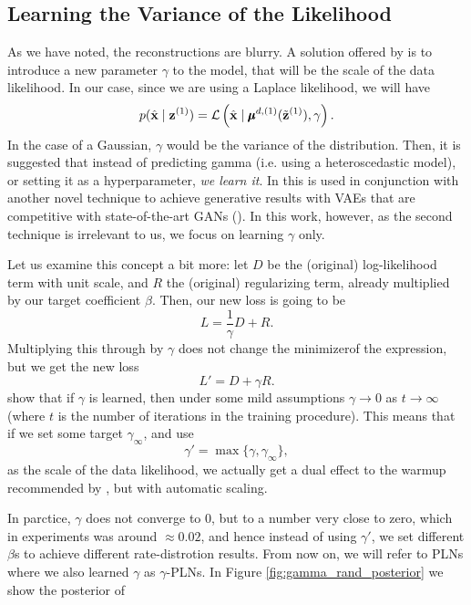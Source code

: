 \subsection{Learning the Variance of the Likelihood}
\label{sec:learn_gamma}
\par
As we have noted, the reconstructions are blurry.
A solution offered by \cite{dai2019diagnosing} is to introduce a new parameter
$\gamma$ to the model, that will be the scale of the data likelihood. In our
case, since we are using a Laplace likelihood, we will have
\[
  p(\hat{\mathbf{x}} \mid \mathbf{z}^{(1)}) = \mathcal{L}\left( \hat{\mathbf{x}} \mid \pmb{\mu}^{d,
      (1)}(\tilde{\mathbf{z}}^{(1)}), \gamma \right).
\]
In the case of a Gaussian, $\gamma$ would be the variance of the distribution.
Then, it is suggested that instead of predicting gamma (i.e. using a
heteroscedastic model), or setting it as a hyperparameter, \textit{we learn it}.
In \cite{dai2019diagnosing} this is used in conjunction with another novel
technique to achieve generative results with VAEs that are competitive with
state-of-the-art GANs (\cite{goodfellow2014generative}). In this work, however,
as the second technique is irrelevant to us, we focus on learning $\gamma$ only.
\par
Let us examine this concept a bit more: let $D$ be the (original) log-likelihood
term with unit scale, and $R$ the (original) regularizing term, already
multiplied by our target coefficient $\beta$. Then, our new loss is going to be
\[
  L = \frac{1}{\gamma}D + R.
\]
Multiplying this through by $\gamma$ does not change the minimizer\footnotemark of the
expression, but we get the new loss
\[
  L' = D + \gamma R.
\]
\cite{dai2019diagnosing} show that if $\gamma$ is learned, then under some mild
assumptions $\gamma \rightarrow 0$ as $t \rightarrow \infty$ (where $t$ is the
number of iterations in the training procedure). This means that if we set some
target $\gamma_\infty$, and use
\[
  \gamma' = \max\{ \gamma, \gamma_\infty \},
\]
as the scale of the data likelihood, we actually get a dual effect to the warmup
recommended by \cite{sonderby2016train}, but with automatic scaling.
\par
In parctice, $\gamma$ does not converge to 0, but to a number very close to
zero, which in experiments was around $\approx 0.02$, and hence instead of using
$\gamma'$, we set different $\beta$s to achieve different rate-distrotion
results. From now on, we will refer to PLNs where we also learned $\gamma$ as
$\gamma$-PLNs. In Figure \ref{fig:gamma_rand_posterior} we show the posterior of 

